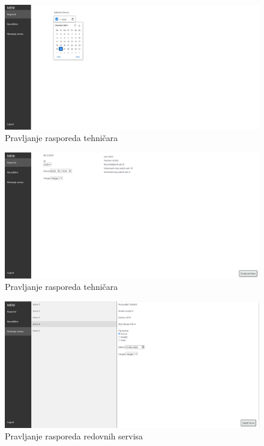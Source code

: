\documentclass[a4paper]{article}
\begin{document}
\begin{figure}[H]
\begin{center}
\includegraphics[scale=0.6, width = 1\textwidth]{UI/zakazivanje_tehnicara_1.png}
\end{center}
\caption{Pravljanje rasporeda tehničara}
\label{fig:ui_raspored_tehnicara_1}
\end{figure}

\begin{figure}[H]
\begin{center}
\includegraphics[scale=0.9, width = 1.2\textwidth]{UI/zakazivanje tehnicara_2.png}
\end{center}
\caption{Pravljanje rasporeda tehničara}
\label{fig:ui_raspored_tehnicara_2}
\end{figure}

\begin{figure}[H]
\begin{center}
\includegraphics[scale=0.3]{UI/planiranje_servisa.png}
\end{center}
\caption{Pravljanje rasporeda redovnih servisa}
\label{fig:ui_raspored_redovnih_servisa}
\end{figure}
\end{document}
